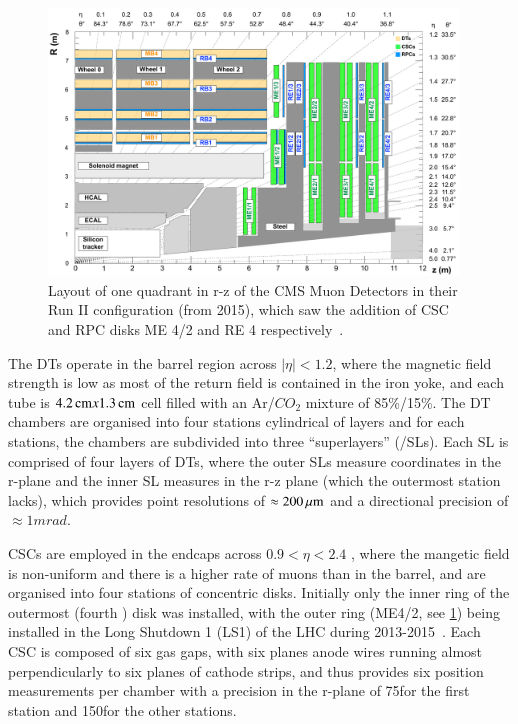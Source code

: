 \begin{figure}[htbp]
\begin{center}
\includegraphics[width=0.97\textwidth]{figs/cms/cms_muon_quadrant_run_ii.pdf}
\caption{Layout of one quadrant in r-z of the CMS Muon Detectors in their Run II configuration (from 2015), which saw the addition of CSC and RPC disks ME 4/2 and RE 4 respectively~\cite{CMS-DP-2016-046}.}
\label{fig:muonChambers}
\end{center}
\end{figure}

The DTs operate in the barrel region across $|\eta| < 1.2$, where the magnetic field strength is low as most of the return field is contained in the iron yoke,	and each tube is $4.2\,\text{cm} x 1.3\,\text{cm}$ cell filled with an Ar/$CO_{2}$ mixture of 85\%/15\%.
The DT chambers are organised into four stations cylindrical of layers and for each stations, the chambers are subdivided into three ``superlayers'' (/SLs).
Each SL is comprised of four layers of DTs, where the outer SLs measure coordinates in the r-\phi plane and the inner SL measures in the r-z plane (which the outermost station lacks), which provides point resolutions of $\approx 200\,\mu\text{m}$ and a \phi directional precision of $\approx 1 mrad$.

CSCs are employed in the endcaps across $0.9 < \eta < 2.4$ , where the mangetic field is non-uniform and there is a higher rate of muons than in the barrel, and are organised into four stations of concentric disks.
Initially only the inner ring of the outermost (fourth ) disk was installed, with the outer ring (ME4/2, see \ref{fig:muonChambers}) being installed in the Long Shutdown 1 (LS1) of the LHC during 2013-2015~\cite{Battilana:2017mrm}.
Each CSC is composed of six gas gaps, with six planes anode wires running almost perpendicularly to six planes of cathode strips, and thus provides six position measurements per chamber with a precision in the r-\phi plane of 75\mum for the first station and 150\mum for the other stations\cite{CMS:1997iti}.

